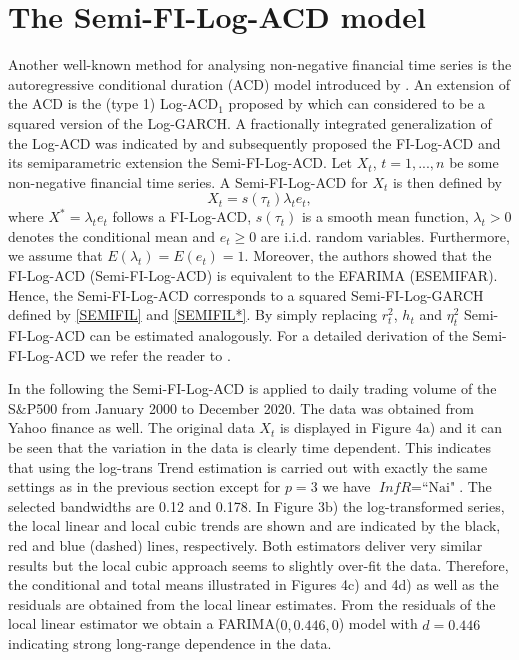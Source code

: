 \documentclass[12pt]{article}
\begin{document}
\section{The Semi-FI-Log-ACD model}
 Another well-known method for analysing non-negative financial time series is the autoregressive conditional duration (ACD) model introduced by \citet{engle1998autoregressive}. An extension of the ACD is the (type 1) Log-ACD$_1$ proposed by \citet{bauwens2008moments} which can considered to be a squared version of the Log-GARCH. A fractionally integrated generalization of the Log-ACD was indicated by \citet{beran2015modelling} and subsequently \citet{feng2015forecasting} proposed the FI-Log-ACD and its semiparametric extension the Semi-FI-Log-ACD. Let $X_t$, $t = 1,...,n$ be some non-negative financial time series. A Semi-FI-Log-ACD for $X_t$ is then defined by 
 \begin{equation}
 	X_t = s(\tau_t) \lambda_t e_t,
 \end{equation}
where $X^* = \lambda_t e_t$ follows a FI-Log-ACD, $s(\tau_t)$ is a smooth mean function, $\lambda_t > 0$ denotes the conditional mean and $e_t \geq 0$ are i.i.d. random variables. Furthermore, we assume that $E(\lambda_t) = E(e_t) = 1$. Moreover, the authors showed that the FI-Log-ACD (Semi-FI-Log-ACD) is equivalent to the EFARIMA (ESEMIFAR). Hence, the Semi-FI-Log-ACD corresponds to a squared Semi-FI-Log-GARCH defined by \eqref{SEMIFIL} and \eqref{SEMIFIL*}. By simply replacing $r_t^2$, $h_t$ and $\eta_t^2$ Semi-FI-Log-ACD can be estimated analogously. For a detailed derivation of the Semi-FI-Log-ACD we refer the reader to \citet{feng2015forecasting}.

 In the following the Semi-FI-Log-ACD is applied to daily trading volume of the S\&P500 from January 2000 to December 2020. The data was obtained from Yahoo finance as well. The original data $X_t$ is displayed in Figure 4a) and it can be seen that the variation in the data is clearly time dependent. This indicates that using the log-trans Trend estimation is carried out with exactly the same settings as in the previous section except for $p=3$ we have $\textit{InfR} = \text{``Nai"}$. The selected bandwidths are 0.12 and 0.178. In Figure 3b) the log-transformed series, the local linear and local cubic trends are shown and are indicated by the black, red and blue (dashed) lines, respectively. Both estimators deliver very similar results but the local cubic approach seems to slightly over-fit the data. Therefore, the conditional and total means illustrated in Figures 4c) and 4d) as well as the residuals are obtained from the local linear estimates. From the residuals of the local linear estimator we obtain a FARIMA($0, 0.446, 0$) model with $\hat{d} = 0.446$ indicating strong long-range dependence in the data. 
 
\end{document}
